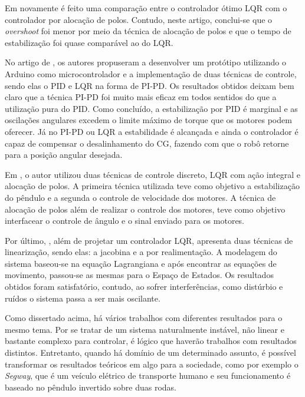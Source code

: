 Em \cite{Junfeng:11} novamente é feito uma comparação entre o controlador ótimo LQR com o controlador por alocação de polos. Contudo, neste artigo, conclui-se que o \textit{overshoot} foi menor por meio da técnica de alocação de polos e que o tempo de estabilização foi quase comparável ao do LQR. 

No artigo de \cite{Juang:13}, os autores propuseram a desenvolver um protótipo utilizando o Arduino como microcontrolador e a implementação de duas técnicas de controle, sendo elas o PID e LQR na forma de PI-PD. Os resultados obtidos deixam bem claro que a técnica PI-PD foi muito mais eficaz em todos sentidos do que a utilização pura do PID. Como concluído, a estabilização por PID é marginal e as oscilações angulares excedem o limite máximo de torque que os motores podem oferecer. Já no PI-PD ou LQR a estabilidade é alcançada e ainda o controlador é capaz de compensar o desalinhamento do CG, fazendo com que o robô retorne para a posição angular desejada.

Em \cite{Paula:14}, o autor utilizou duas técnicas de controle discreto, LQR com ação integral e alocação de polos. A primeira técnica utilizada teve como objetivo a estabilização do pêndulo e a segunda o controle de velocidade dos motores. A técnica de alocação de polos além de realizar o controle dos motores, teve como objetivo interfacear o controle de ângulo e o sinal enviado para os motores. 

Por último, \cite{Alves:18}, além de projetar um controlador LQR, apresenta duas técnicas de linearização, sendo elas: a jacobina e a por realimentação. A modelagem do sistema baseou-se na equação Lagrangiana e após encontrar as equações de movimento, passou-se as mesmas para o Espaço de Estados. Os resultados obtidos foram satisfatório, contudo, ao sofrer interferências, como distúrbio e ruídos o sistema passa a ser mais oscilante.

Como dissertado acima, há vários trabalhos com diferentes resultados para o mesmo tema. Por se tratar de um sistema naturalmente instável, não linear e bastante complexo para controlar, é lógico que haverão trabalhos com resultados distintos. Entretanto, quando há domínio de um determinado assunto, é possível transformar os resultados teóricos em algo para a sociedade, como por exemplo o \textit{Segway}, que é um veículo elétrico de transporte humano e seu funcionamento é baseado no pêndulo invertido sobre duas rodas.

